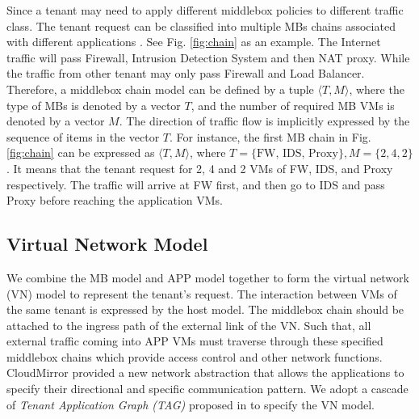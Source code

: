 \documentclass[10pt, conference, letterpaper]{IEEEtran}
\begin{document}

Since a tenant may need to apply different middlebox policies to different traffic class. The tenant request can be classified into multiple MBs chains associated with different applications \cite{stratos12, M14sap, 7243304}. See Fig. \ref{fig:chain} as an example. The Internet traffic will pass Firewall, Intrusion Detection System and then NAT proxy. While the traffic from other tenant may only pass Firewall and Load Balancer. Therefore, a middlebox chain model can be defined by a tuple $\langle T, M \rangle$, where the type of MBs is denoted by a vector $T$, and the number of required MB VMs is denoted by a vector $M$. The direction of traffic flow is implicitly expressed by the sequence of items in the vector $T$. For instance, the first MB chain in Fig. \ref{fig:chain} can be expressed as $\langle T, M \rangle$, where $T=\{\text{FW, IDS, Proxy}\}, M=\{2, 4, 2\}$. It means that the tenant request for 2, 4 and 2 VMs of FW, IDS, and Proxy respectively. The traffic will arrive at FW first, and then go to IDS and pass Proxy before reaching the application VMs.

\subsection{Virtual Network Model} 
We combine the MB model and APP model together to form the virtual network (VN) model to represent the tenant's request. The interaction between VMs of the same tenant is expressed by the host model. The middlebox chain should be attached to the ingress path of the external link of the VN. Such that, all external traffic coming into APP VMs must traverse through these specified middlebox chains which provide access control and other network functions. CloudMirror \cite{cloudmirror} provided a new network abstraction that allows the applications to specify their directional and specific communication pattern. We adopt a cascade of \emph{Tenant Application Graph (TAG)} proposed in \cite{cloudmirror} to specify the VN model. 
\end{document}

